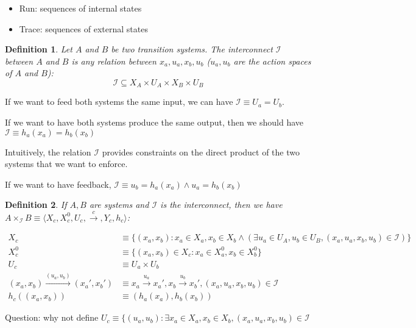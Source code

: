 \documentclass[11pt]{book}
\newtheorem{definition}{Definition}
\begin{document}
\begin{itemize}
    \item Run: sequences of internal states 
    \item Trace: sequences of external states 
\end{itemize}

\begin{definition}
    Let $A$ and $B$ be two transition systems. The interconnect
    $\mathcal{I}$ between $A$ and $B$ is any relation between
    $x_a, u_a, x_b, u_b$
    ($u_a, u_b$ are the action spaces of $A$ and $B$):
    $$
    \mathcal I \subseteq X_A \times U_A \times X_B \times U_B
    $$
\end{definition}


If we want to feed both systems the same input, we can have 
$\mathcal I \equiv U_a = U_b$.

If we want to have both systems produce the same output, then we should have
$\mathcal I \equiv h_a(x_a) = h_b(x_b)$

Intuitively, the relation $\mathcal I$ provides constraints on the direct product
of the two systems that we want to enforce.


If we want to have feedback,
$\mathcal I \equiv u_b = h_a(x_a) \land u_a = h_b(x_b)$

\begin{definition}
    If $A, B$ are systems and $\mathcal{I}$ is the interconnect, then
    we have $A \times_{\mathcal I} B \equiv \langle X_c, X_c^0, U_c, \xrightarrow{c}, Y_c, h_c \rangle$:

    \begin{align*}
        X_c &\equiv \{ (x_a, x_b) : 
          x_a \in X_a, x_b \in X_b \land  (\exists u_a \in U_A, u_b \in U_B, 
          (x_a, u_a, x_b, u_b) \in \mathcal{I}) \} \\
        X_c^0 &\equiv \{ (x_a, x_b) \in X_c  : 
          x_a \in X_a^0, x_b \in X_b^0 \} \\
    U_c &\equiv U_a \times U_b \\
    (x_a, x_b) \xrightarrow{(u_a, u_b)} (x_a', x_b') &\equiv 
    x_a \xrightarrow{u_a} x_a', 
    x_b \xrightarrow{u_b} x_b', 
    (x_a, u_a, x_b, u_b) \in \mathcal{I} \\
    h_c((x_a, x_b)) &\equiv (h_a(x_a), h_b(x_b))
    \end{align*}
\end{definition}
Question: why not define 
$U_c \equiv \{ (u_a, u_b) : 
\exists x_a \in X_a, x_b \in X_b, (x_a, u_a, x_b, u_b) \in \mathcal I$
\end{document}
